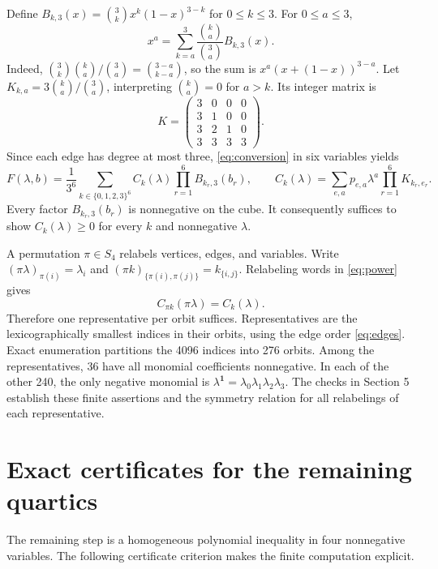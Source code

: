 \documentclass[11pt,letterpaper]{article}
\newcommand{\one}{\boldsymbol{1}}
\begin{document}
Define $B_{k,3}(x)=\binom3k x^k(1-x)^{3-k}$ for $0\le k\le3$. For $0\le a\le3$,
\begin{equation}\label{eq:conversion}
x^a=\sum_{k=a}^3\frac{\binom{k}{a}}{\binom3a}B_{k,3}(x).
\end{equation}
Indeed, $\binom3k\binom ka/\binom3a=\binom{3-a}{k-a}$, so the sum is $x^a(x+(1-x))^{3-a}$. Let $K_{k,a}=3\binom ka/\binom3a$, interpreting $\binom ka=0$ for $a>k$. Its integer matrix is
\begin{equation}\label{eq:K}
K=\begin{pmatrix}3&0&0&0\\3&1&0&0\\3&2&1&0\\3&3&3&3\end{pmatrix}.
\end{equation}
Since each edge has degree at most three, \eqref{eq:conversion} in six variables yields
\begin{equation}\label{eq:bernstein}
F(\lambda,b)=\frac1{3^6}\sum_{k\in\{0,1,2,3\}^6}C_k(\lambda)
 \prod_{r=1}^6B_{k_r,3}(b_r),\qquad
C_k(\lambda)=\sum_{e,a}p_{e,a}\lambda^a\prod_{r=1}^6K_{k_r,e_r}.
\end{equation}
Every factor $B_{k_r,3}(b_r)$ is nonnegative on the cube. It consequently suffices to show $C_k(\lambda)\ge0$ for every $k$ and nonnegative $\lambda$.

A permutation $\pi\in S_4$ relabels vertices, edges, and variables. Write $(\pi\lambda)_{\pi(i)}=\lambda_i$ and $(\pi k)_{\{\pi(i),\pi(j)\}}=k_{\{i,j\}}$. Relabeling words in \eqref{eq:power} gives
\begin{equation}\label{eq:symmetry}
C_{\pi k}(\pi\lambda)=C_k(\lambda).
\end{equation}
Therefore one representative per orbit suffices. Representatives are the lexicographically smallest indices in their orbits, using the edge order \eqref{eq:edges}. Exact enumeration partitions the 4096 indices into 276 orbits. Among the representatives, 36 have all monomial coefficients nonnegative. In each of the other 240, the only negative monomial is $\lambda^{\one}=\lambda_0\lambda_1\lambda_2\lambda_3$. The checks in Section 5 establish these finite assertions and the symmetry relation for all relabelings of each representative.

\section{Exact certificates for the remaining quartics}
The remaining step is a homogeneous polynomial inequality in four nonnegative variables. The following certificate criterion makes the finite computation explicit.
\end{document}
